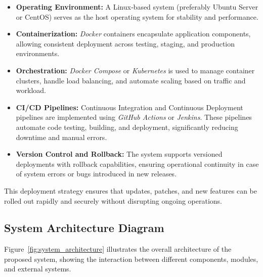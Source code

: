\documentclass[12pt,a4paper]{article}
\begin{document}
\begin{itemize}
    \item \textbf{Operating Environment:} A Linux‑based system (preferably Ubuntu Server or CentOS) serves as the host operating system for stability and performance.
    
    \item \textbf{Containerization:} \textit{Docker} containers encapsulate application components, allowing consistent deployment across testing, staging, and production environments.
    
    \item \textbf{Orchestration:} \textit{Docker Compose} or \textit{Kubernetes} is used to manage container clusters, handle load balancing, and automate scaling based on traffic and workload.
    
    \item \textbf{CI/CD Pipelines:} Continuous Integration and Continuous Deployment pipelines are implemented using \textit{GitHub Actions} or \textit{Jenkins}.  These pipelines automate code testing, building, and deployment, significantly reducing downtime and manual errors.
    
    \item \textbf{Version Control and Rollback:} The system supports versioned deployments with rollback capabilities, ensuring operational continuity in case of system errors or bugs introduced in new releases.
\end{itemize}

This deployment strategy ensures that updates, patches, and new features can be rolled out rapidly and securely without disrupting ongoing operations.

\subsection{System Architecture Diagram}
Figure~\ref{fig:system_architecture} illustrates the overall architecture of the proposed system, showing the interaction between different components, modules, and external systems.
\end{document}
